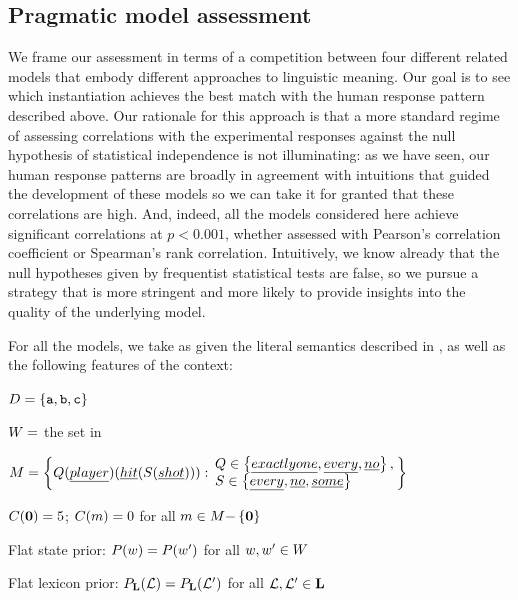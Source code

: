 \documentclass[leqno]{article}
\begin{document}

\subsection{Pragmatic model assessment}

We frame our assessment in terms of a competition between four
different related models that embody different approaches to
linguistic meaning. Our goal is to see which instantiation achieves
the best match with the human response pattern described above. Our
rationale for this approach is that a more standard regime of
assessing correlations with the experimental responses against the
null hypothesis of statistical independence is not illuminating: as we
have seen, our human response patterns are broadly in agreement with
intuitions that guided the development of these models so we can take
it for granted that these correlations are high. And, indeed, all the
models considered here achieve significant correlations at $p <
0.001$, whether assessed with Pearson's correlation coefficient or
Spearman's rank correlation.  Intuitively, we know already that the
null hypotheses given by frequentist statistical tests are false, so
we pursue a strategy that is more stringent and more likely to provide
insights into the quality of the underlying model.

For all the models, we take as given the literal semantics described
in , as well as the following features of the
context:
%
\begin{examples}
\item\label{expmod}
  \begin{examples}
  \item $D = \left\{ \texttt{a}, \texttt{b}, \texttt{c} \right\}$
  \item $W = $ the set in 
  \item\label{expformulae} $\Messages =
    \setlength{\arraycolsep}{2pt}
    \set{
      Q(\word{player})(\word{hit}(S(\word{shot}))) :
      \begin{array}{l}        
        Q \in \set{\word{exactly one}, \word{every}, \word{no}}, \\
        S \in \set{\word{every}, \word{no}, \word{some}}
      \end{array}}$
  \item $C(\mathbf{0}) = 5$; $C(m) = 0$ for all $m \in M{-}\left\{ \mathbf{0} \right\}$  
  \item Flat state prior: $P(w) = P(w')$ for all $w, w' \in W$
  \item Flat lexicon prior: $P_{\mathbf{L}}(\mathcal{L}) = P_{\mathbf{L}}(\mathcal{L}')$ for all $\mathcal{L}, \mathcal{L}' \in \mathbf{L}$
  \end{examples}
\end{examples}
\end{document}
